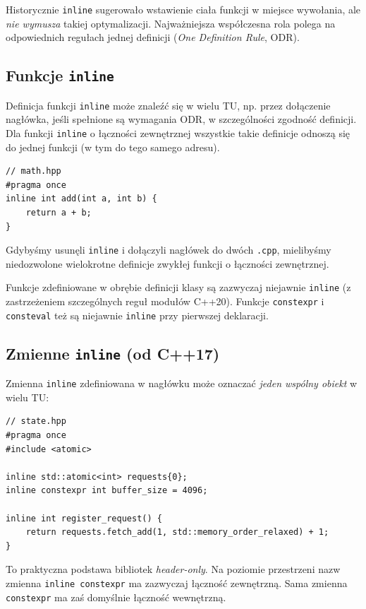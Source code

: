 Historycznie \texttt{inline} sugerowało wstawienie ciała funkcji
w miejsce wywołania, ale \emph{nie wymusza} takiej optymalizacji.
Najważniejsza współczesna rola polega na odpowiednich regułach
jednej definicji (\emph{One Definition Rule}, ODR).

\subsection{Funkcje \texttt{inline}}

Definicja funkcji \texttt{inline} może znaleźć się w wielu TU,
np. przez dołączenie nagłówka, jeśli spełnione są wymagania ODR,
w szczególności zgodność definicji. Dla funkcji \texttt{inline}
o łączności zewnętrznej wszystkie takie definicje odnoszą się
do jednej funkcji (w tym do tego samego adresu).

\begin{lstlisting}
// math.hpp
#pragma once
inline int add(int a, int b) {
    return a + b;
}
\end{lstlisting}

Gdybyśmy usunęli \texttt{inline} i dołączyli nagłówek do dwóch
\texttt{.cpp}, mielibyśmy niedozwolone wielokrotne definicje zwykłej
funkcji o łączności zewnętrznej.

Funkcje zdefiniowane w obrębie definicji klasy są zazwyczaj niejawnie
\texttt{inline} (z zastrzeżeniem szczególnych reguł modułów C++20).
Funkcje \texttt{constexpr} i \texttt{consteval} też są niejawnie
\texttt{inline} przy pierwszej deklaracji.

\subsection{Zmienne \texttt{inline} (od C++17)}

Zmienna \texttt{inline} zdefiniowana w nagłówku może oznaczać
\emph{jeden wspólny obiekt} w wielu TU:

\begin{lstlisting}
// state.hpp
#pragma once
#include <atomic>

inline std::atomic<int> requests{0};
inline constexpr int buffer_size = 4096;

inline int register_request() {
    return requests.fetch_add(1, std::memory_order_relaxed) + 1;
}
\end{lstlisting}

To praktyczna podstawa bibliotek \emph{header-only}. Na poziomie
przestrzeni nazw zmienna \texttt{inline constexpr} ma zazwyczaj
łączność zewnętrzną. Sama zmienna \texttt{constexpr} ma zaś
domyślnie łączność wewnętrzną.

